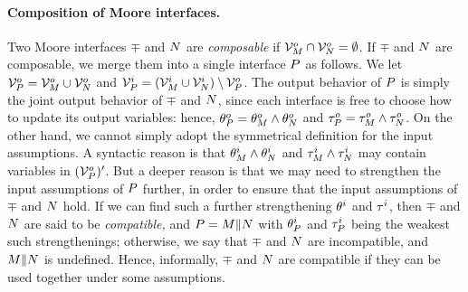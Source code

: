 \begin{comment}
\paragraph{Closed and universal interfaces.}

\mynote{useful?}
A Moore interface is {\em closed\/} if it has no input variables, and
is {\em universal\/} if it does not make any assumption about the
input behavior. 

\begin{defi}{(closed and universal Moore interfaces)}
A Moore interface $\mp = \tuple{\ivars_\mp, \ovars_\mp,
\iinit_\mp, \oinit_\mp, \itrans_\mp, \otrans_\mp}$ is 
{\em closed\/} if $\ivars_\mp = \emptyset$, and is 
{\em universal\/} if $\iinit_\mp = \true$ and $\itrans_\mp = \true$. 
\qed
\end{defi}

\noindent
An universal Moore interface is thus essentially equivalent to a Moore
version of the classical models used in model checking 
\cite{SMV96,VIS96,RM96journal}.
\mynote{better citations?}
\end{comment}



\paragraph{Composition of Moore interfaces.}
%
Two Moore interfaces $\mp$ and $N$ 
are {\em composable\/} if ${\cal V}^o_M \cap {\cal V}^o_N = \emptyset$.
If $\mp$ and $N$ are composable, we merge them into a single
interface $P$ as follows. 
We let ${\cal V}^o_P = {\cal V}^o_M \cup {\cal V}^o_N$ and 
${\cal V}^i_P = ({\cal V}^i_M \cup {\cal V}^i_N) \setminus {\cal V}^o_P$. 
The output behavior of $P$ is simply the joint output behavior of
$\mp$ and $N$, since each interface is free to choose how to update
its output variables: hence,
$\theta^o_P = \theta^o_M \wedge \theta^o_N$ and 
$\tau^o_P = \tau^o_M \wedge \tau^o_N$.
On the other hand, we cannot simply adopt the symmetrical definition
for the input assumptions. 
A syntactic reason is that $\theta^i_M \wedge \theta^i_N$ and 
$\tau^i_M \wedge \tau^i_N$ may contain variables in $({\cal V}^o_P)'$.
But a deeper reason is that we may need to strengthen the input
assumptions of $P$ further, in order to ensure that the 
input assumptions of $\mp$ and $N$ hold. 
If we can find such a further strengthening $\theta^i$ and
$\tau^i$, then $\mp$ and $N$ are said to be
{\em compatible,} and $P = M \| N$ with $\theta^i_P$ and $\tau^i_P$
being the weakest such strengthenings;
otherwise, we say that $\mp$ and $N$ are incompatible, and
$M\|N$ is undefined. 
Hence, informally, $\mp$ and $N$ are compatible if they can be used
together under some assumptions. 

